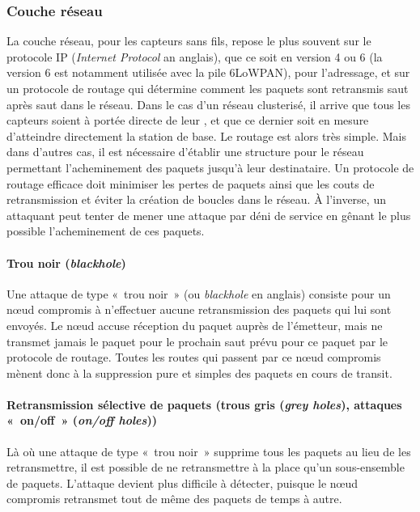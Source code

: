     \subsubsection{Couche réseau}
La couche réseau, pour les capteurs sans fils, repose le plus souvent sur le protocole IP (\textit{Internet Protocol} an anglais), que ce soit en version 4 ou 6 (la version 6 est notamment utilisée avec la pile 6LoWPAN), pour l'adressage, et sur un protocole de routage qui détermine comment les paquets sont retransmis saut après saut dans le réseau.
Dans le cas d'un réseau clusterisé, il arrive que tous les capteurs soient à portée directe de leur \ch, et que ce dernier soit en mesure d'atteindre directement la station de base.
Le routage est alors très simple.
Mais dans d'autres cas, il est nécessaire d'établir une structure pour le réseau permettant l'acheminement des paquets jusqu'à leur destinataire.
Un protocole de routage efficace doit minimiser les pertes de paquets ainsi que les couts de retransmission et éviter la création de boucles dans le réseau.
À l'inverse, un attaquant peut tenter de mener une attaque par déni de service en gênant le plus possible l'acheminement de ces paquets.

        \paragraph{Trou noir (\textit{blackhole})}
Une attaque de type « trou noir » (ou \textit{blackhole} en anglais) consiste pour un nœud compromis à n'effectuer aucune retransmission des paquets qui lui sont envoyés.
Le nœud accuse réception du paquet auprès de l'émetteur, mais ne transmet jamais le paquet pour le prochain saut prévu pour ce paquet par le protocole de routage.
Toutes les routes qui passent par ce nœud compromis mènent donc à la suppression pure et simples des paquets en cours de transit.

        \paragraph{Retransmission sélective de paquets (trous gris (\textit{grey holes}), attaques « on/off » (\textit{on/off holes}))}
Là où une attaque de type « trou noir » supprime tous les paquets au lieu de les retransmettre, il est possible de ne retransmettre à la place qu'un sous-ensemble de paquets.
L'attaque devient plus difficile à détecter, puisque le nœud compromis retransmet tout de même des paquets de temps à autre.

